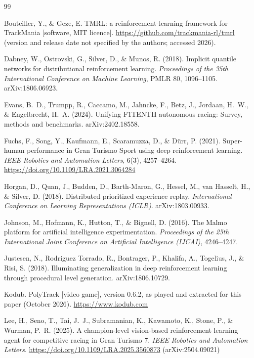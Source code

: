 \documentclass[11pt]{article}
\begin{document}
\begin{thebibliography}{99}

 Bouteiller, Y., \& Geze, E. TMRL: a reinforcement-learning framework for TrackMania [software, MIT licence]. \url{https://github.com/trackmania-rl/tmrl} (version and release date not specified by the authors; accessed 2026).

 Dabney, W., Ostrovski, G., Silver, D., \& Munos, R. (2018). Implicit quantile networks for distributional reinforcement learning. \textit{Proceedings of the 35th International Conference on Machine Learning}, PMLR 80, 1096--1105. arXiv:1806.06923.

 Evans, B.~D., Trumpp, R., Caccamo, M., Jahncke, F., Betz, J., Jordaan, H.~W., \& Engelbrecht, H.~A. (2024). Unifying F1TENTH autonomous racing: Survey, methods and benchmarks. arXiv:2402.18558.

 Fuchs, F., Song, Y., Kaufmann, E., Scaramuzza, D., \& D\"urr, P. (2021). Super-human performance in Gran Turismo Sport using deep reinforcement learning. \textit{IEEE Robotics and Automation Letters}, 6(3), 4257--4264. \url{https://doi.org/10.1109/LRA.2021.3064284}

 Horgan, D., Quan, J., Budden, D., Barth-Maron, G., Hessel, M., van Hasselt, H., \& Silver, D. (2018). Distributed prioritized experience replay. \textit{International Conference on Learning Representations (ICLR)}. arXiv:1803.00933.

 Johnson, M., Hofmann, K., Hutton, T., \& Bignell, D. (2016). The Malmo platform for artificial intelligence experimentation. \textit{Proceedings of the 25th International Joint Conference on Artificial Intelligence (IJCAI)}, 4246--4247.

 Justesen, N., Rodriguez Torrado, R., Bontrager, P., Khalifa, A., Togelius, J., \& Risi, S. (2018). Illuminating generalization in deep reinforcement learning through procedural level generation. arXiv:1806.10729.

 Kodub. PolyTrack [video game], version 0.6.2, as played and extracted for this paper (October 2026). \url{https://www.kodub.com}

 Lee, H., Seno, T., Tai, J.~J., Subramanian, K., Kawamoto, K., Stone, P., \& Wurman, P.~R. (2025). A champion-level vision-based reinforcement learning agent for competitive racing in Gran Turismo 7. \textit{IEEE Robotics and Automation Letters}. \url{https://doi.org/10.1109/LRA.2025.3560873} (arXiv:2504.09021)


\end{thebibliography}
\end{document}
